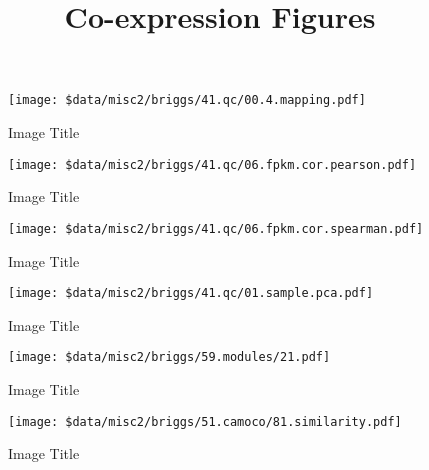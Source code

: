 \documentclass[11pt,]{article}
\title{Co-expression Figures  }
\author{}
\date{}
\begin{document}
    
%

{%
\setlength{\parindent}{0pt}
\thispagestyle{plain}
{\fontsize{18}{20}\selectfont\raggedright 
\maketitle  %

}

{
   \vskip 13.5pt\relax \normalsize\fontsize{11}{12} 
 

}

}






\vskip 6.5pt


\noindent  \begin{figure}
\centering
\texttt{[image: \$data/misc2/briggs/41.qc/00.4.mapping.pdf]}
\caption{Image Title}
\end{figure}

\begin{figure}
\centering
\texttt{[image: \$data/misc2/briggs/41.qc/06.fpkm.cor.pearson.pdf]}
\caption{Image Title}
\end{figure}

\begin{figure}
\centering
\texttt{[image: \$data/misc2/briggs/41.qc/06.fpkm.cor.spearman.pdf]}
\caption{Image Title}
\end{figure}

\begin{figure}
\centering
\texttt{[image: \$data/misc2/briggs/41.qc/01.sample.pca.pdf]}
\caption{Image Title}
\end{figure}

\begin{figure}
\centering
\texttt{[image: \$data/misc2/briggs/59.modules/21.pdf]}
\caption{Image Title}
\end{figure}

\begin{figure}
\centering
\texttt{[image: \$data/misc2/briggs/51.camoco/81.similarity.pdf]}
\caption{Image Title}
\end{figure}
\end{document}
